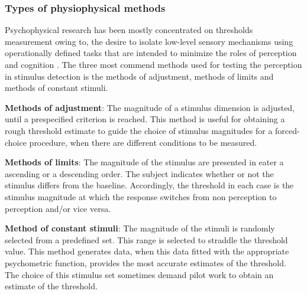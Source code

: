 \subsubsection{Types of physiophysical methods}
Psychophysical research has been mostly concentrated on thresholds measurement owing to, the desire to isolate low-level sensory mechanisms using operationally defined tasks that are intended to minimize the roles of perception and cognition \cite{Pelli2010}. The three most commend methods used for testing the perception in stimulus detection is the methods of adjustment, methods of limits and methods of constant stimuli.

\textbf{Methods of adjustment}: The magnitude of a stimulus dimension is adjusted, until a prespecified criterion is reached. This method is useful for obtaining a rough threshold estimate to guide the choice of stimulus magnitudes for a forced-choice procedure, when there are different conditions to be measured. \cite{Kingdom2016}

\textbf{Methods of limits}: The magnitude of the stimulus are presented in eater a ascending or a descending order.
The subject indicates whether or not the stimulus differs from the baseline. Accordingly, the threshold in each case is the stimulus magnitude at which the response switches from non perception to perception and/or vice versa. \cite{Kingdom2016}

\textbf{Method of constant stimuli}: The magnitude of the stimuli is randomly selected from a predefined set. This range is selected to straddle the threshold value. This method generates data, when this data fitted with the appropriate psychometric function, provides the most accurate estimates of the threshold. The choice of this stimulus set sometimes demand pilot work to obtain an estimate of the threshold. 




